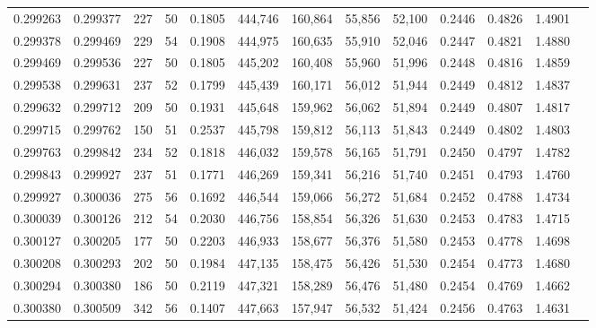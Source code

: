 \begin{tabular}{rrrrrrrrrrrrr}
0.299263 & 0.299377 &   227 &  50 &                                     0.1805 & 444,746 & 160,864 &  55,856 &  52,100 & 0.2446 & 0.4826 & 1.4901 \\
0.299378 & 0.299469 &   229 &  54 &                                     0.1908 & 444,975 & 160,635 &  55,910 &  52,046 & 0.2447 & 0.4821 & 1.4880 \\
0.299469 & 0.299536 &   227 &  50 &                                     0.1805 & 445,202 & 160,408 &  55,960 &  51,996 & 0.2448 & 0.4816 & 1.4859 \\
0.299538 & 0.299631 &   237 &  52 &                                     0.1799 & 445,439 & 160,171 &  56,012 &  51,944 & 0.2449 & 0.4812 & 1.4837 \\
0.299632 & 0.299712 &   209 &  50 &                                     0.1931 & 445,648 & 159,962 &  56,062 &  51,894 & 0.2449 & 0.4807 & 1.4817 \\
0.299715 & 0.299762 &   150 &  51 &                                     0.2537 & 445,798 & 159,812 &  56,113 &  51,843 & 0.2449 & 0.4802 & 1.4803 \\
0.299763 & 0.299842 &   234 &  52 &                                     0.1818 & 446,032 & 159,578 &  56,165 &  51,791 & 0.2450 & 0.4797 & 1.4782 \\
0.299843 & 0.299927 &   237 &  51 &                                     0.1771 & 446,269 & 159,341 &  56,216 &  51,740 & 0.2451 & 0.4793 & 1.4760 \\
0.299927 & 0.300036 &   275 &  56 &                                     0.1692 & 446,544 & 159,066 &  56,272 &  51,684 & 0.2452 & 0.4788 & 1.4734 \\
0.300039 & 0.300126 &   212 &  54 &                                     0.2030 & 446,756 & 158,854 &  56,326 &  51,630 & 0.2453 & 0.4783 & 1.4715 \\
0.300127 & 0.300205 &   177 &  50 &                                     0.2203 & 446,933 & 158,677 &  56,376 &  51,580 & 0.2453 & 0.4778 & 1.4698 \\
0.300208 & 0.300293 &   202 &  50 &                                     0.1984 & 447,135 & 158,475 &  56,426 &  51,530 & 0.2454 & 0.4773 & 1.4680 \\
0.300294 & 0.300380 &   186 &  50 &                                     0.2119 & 447,321 & 158,289 &  56,476 &  51,480 & 0.2454 & 0.4769 & 1.4662 \\
0.300380 & 0.300509 &   342 &  56 &                                     0.1407 & 447,663 & 157,947 &  56,532 &  51,424 & 0.2456 & 0.4763 & 1.4631 \\

\end{tabular}
